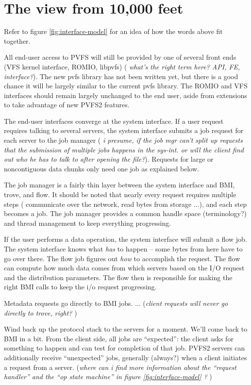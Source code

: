 \documentclass[10pt]{article} %
\begin{document}
\section{The view from 10,000 feet}

Refer to figure \ref{fig:interface-model} for an idea of how the words above
fit together.

All end-user access to PVFS will still be provided by one of several
front ends (VFS kernel interface, ROMIO, libpvfs) ( {\it what's the
right term here?  API, FE, interface?}).  The new pvfs library has not
been written yet, but there is a good chance it will be largely similar
to the current pvfs library.  The ROMIO and VFS interfaces should remain
largely unchanged to the end user, aside from extensions to take
advantage of new PVFS2 features.

The end-user interfaces converge at the system interface.  If a user
request requires talking to several servers, the system interface
submits a job request for each server to the job manager ( {\it i
presume, if the job mgr can't split up requests that the submission of
multiple jobs happens in the sys-int.  or will the client find out who
he has to talk to after opening the file?}).  Requests for
large or noncontiguous data chunks only need one job as explained below.

The job manager is a fairly thin layer between the system interface and
BMI, trove, and flow.  It should be noted that nearly every request
requires multiple steps ( communicate over the network, read bytes from
storage ...), and each step becomes a job. The job manager provides a
common handle space (terminology?) and thread management to keep
everything progressing.

If the user performs a data operation, the system interface will submit
a flow job.  The system interface knows what {\em has} to happen -- some
bytes from here have to go over there.  The flow job figures out {\em how}
to accomplish the request.  The flow can compute how much data comes from
which servers based on the I/O request and the distribution parameters.
The flow then is responsible for making the right BMI calls to keep the
i/o request progressing. 

Metadata requests go directly to BMI jobs.  ... ({\em client requests
will never go directly to trove, right? })

Wind back up the protocol stack to the servers for a moment.  We'll
come back to BMI in a bit.   From the client side, all jobs are
``expected'': the client asks for something to happen and can test for
completion of that job.  PVFS2 servers can additionally receive
``unexpected'' jobs, generally (always?) when a client initiates a
request from a server.  ({\em where can i find more information about
the ``request handler'' and the ``op state machine'' in
figure \ref{fig:interface-model} ?} ) 
\end{document}
